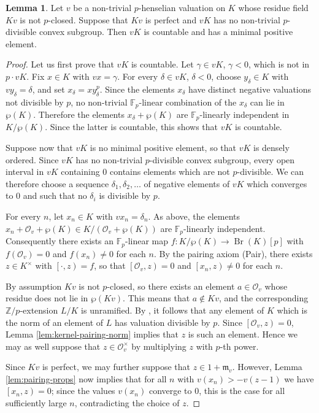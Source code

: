 \documentclass[a4paper, british, oneside]{amsart}
\newcommand{\Z}{\mathbb{Z}}
\newcommand{\F}{\mathbb{F}}
\DeclareMathOperator{\Br}{Br}
\newcommand{\pair}[2]{\left[{#1}, {#2}\right)}
\theoremstyle{definition}
\newtheorem{lemma}[theorem]{Lemma}
\theoremstyle{remark}
\begin{document}
\begin{lemma}\label{lem:perfect-implies-uniformiser}
  Let $v$ be a non-trivial $p$-henselian valuation on $K$ whose residue field $Kv$ is not $p$-closed.
  Suppose that $Kv$ is perfect and $vK$ has no non-trivial $p$-divisible convex subgroup.
  Then $vK$ is countable and has a minimal positive element.
\end{lemma}
\begin{proof}
  Let us first prove that $vK$ is countable.
  Let $\gamma \in vK$, $\gamma < 0$, which is not in $p \cdot vK$.
  Fix $x \in K$ with $vx = \gamma$.
  For every $\delta \in vK$, $\delta < 0$, choose $y_\delta \in K$ with $vy_\delta = \delta$, and set $x_\delta = x y_\delta^p$.
  Since the elements $x_\delta$ have distinct negative valuations not divisible by $p$,
  no non-trivial $\F_p$-linear combination of the $x_\delta$ can lie in $\wp(K)$.
  Therefore the elements $x_\delta + \wp(K)$ are $\F_p$-linearly independent in $K/\wp(K)$.
  Since the latter is countable, this shows that $vK$ is countable.

  Suppose now that $vK$ is no minimal positive element, so that $vK$ is densely ordered.
  Since $vK$ has no non-trivial $p$-divisible convex subgroup,
  every open interval in $vK$ containing $0$ contains elements which are not $p$-divisible.
  We can therefore choose a sequence $\delta_1, \delta_2, \dotsc$ of negative elements of $vK$ which converges to $0$ and such that no $\delta_i$ is divisible by $p$.

  For every $n$, let $x_n \in K$ with $vx_n = \delta_n$.
  As above, the elements $x_n + \mathcal{O}_v + \wp(K) \in K/(\mathcal{O}_v + \wp(K))$ are $\F_p$-linearly independent.
  Consequently there exists an $\F_p$-linear map $f \colon K/\wp(K) \to \Br(K)[p]$
  with $f(\mathcal{O}_v) = 0$ and $f(x_n) \neq 0$ for each $n$.
  By the pairing axiom (Pair), there exists $z \in K^\times$ with $\pair{\cdot}{z} = f$,
  so that $\pair{\mathcal{O}_v}{z} = 0$ and $\pair{x_n}{z} \neq 0$ for each $n$.

  By assumption $Kv$ is not $p$-closed,
  so there exists an element $a \in \mathcal{O}_v$ whose residue does not lie in $\wp(Kv)$.
  This means that $a \not\in Kv$, and the corresponding $\Z/p$-extension $L/K$ is unramified.
  By \cite[Remark 3.2.17]{EnglerPrestel}, it follows that any element of $K$ which is the norm of an element of $L$ has valuation divisible by $p$.
  Since $\pair{\mathcal{O}_v}{z} = 0$, Lemma \ref{lem:kernel-pairing-norm} implies that $z$ is such an element.
  Hence we may as well suppose that $z \in \mathcal{O}_v^\times$ by multiplying $z$ with $p$-th power.

  Since $Kv$ is perfect, we may further suppose that $z \in 1 + \mathfrak{m}_v$.
  However, Lemma \ref{lem:pairing-props} now implies that
  for all $n$ with $v(x_n) > -v(z-1)$ we have $\pair{x_n}{z} = 0$;
  since the values $v(x_n)$ converge to $0$, this is the case for all sufficiently large $n$, contradicting the choice of $z$.
\end{proof}
\end{document}
